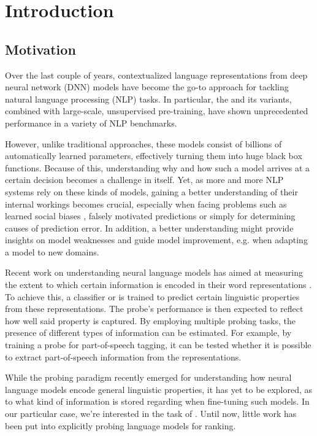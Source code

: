 \chapter{Introduction}
\section{Motivation}
Over the last couple of years, contextualized language representations from deep neural network (DNN) models have become the go-to approach for tackling natural language processing (NLP) tasks. In particular, the  \citep{vaswani2017attention} and its variants, combined with large-scale, unsupervised pre-training, have shown unprecedented performance in a variety of NLP benchmarks.

However, unlike traditional approaches, these models consist of billions of automatically learned parameters, effectively turning them into huge black box functions. Because of this, understanding why and how such a model arrives at a certain decision becomes a challenge in itself. Yet, as more and more NLP systems rely on these kinds of models, gaining a better understanding of their internal workings becomes crucial, especially when facing problems such as learned social biases \citep{Nadeem2021StereoSetMS,Bender2021OnTD, kurita2019measuring}, falsely motivated predictions \citep{10.1145/2939672.2939778, DBLP:journals/corr/abs-1802-00614} or simply for determining causes of prediction error. In addition, a better understanding might provide insights on model weaknesses and guide model improvement, e.g. when adapting a model to new domains.

Recent work on understanding neural language models has aimed at measuring the extent to which certain information is encoded in their word representations \citep{tenney-etal-2019-bert,Tenney2019WhatDY,DBLP:journals/corr/abs-1909-03368}. To achieve this, a  classifier or  is trained to predict certain linguistic properties from these representations. The probe's performance is then expected to reflect how well said property is captured. By employing multiple probing tasks, the presence of different types of information can be estimated. For example, by training a probe for part-of-speech tagging, it can be tested whether it is possible to extract part-of-speech information from the representations.

While the probing paradigm recently emerged for understanding how neural language models encode general linguistic properties, it has yet to be explored, as to what kind of information is stored regarding  when fine-tuning such models. In our particular case, we're interested in the task of . Until now, little work has been put into explicitly probing language models for ranking.

